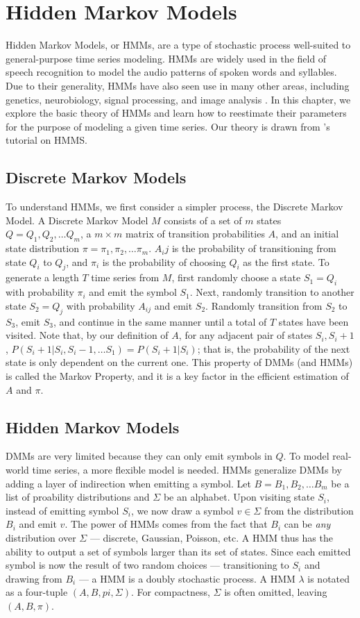 \chapter{Hidden Markov Models}
Hidden Markov Models, or HMMs, are a type of stochastic process well-suited to general-purpose time series modeling. HMMs are widely used in the field of speech recognition to model the audio patterns of spoken words and syllables. Due to their generality, HMMs have also seen use in many other areas, including genetics, neurobiology, signal processing, and image analysis \citep{pyle}. In this chapter, we explore the basic theory of HMMs and learn how to reestimate their parameters for the purpose of modeling a given time series. Our theory is drawn from \citet{rabinerpi89}'s tutorial on HMMS.
\section{Discrete Markov Models}
To understand HMMs, we first consider a simpler process, the Discrete Markov Model. A Discrete Markov Model $M$ consists of a set of $m$ states $Q = Q_1, Q_2, \dots Q_m$, a $m \times m$ matrix of transition probabilities $A$, and an initial state distribution $\pi = \pi_1, \pi_2, \dots \pi_m$. $A_ij$ is the probability of transitioning from state $Q_i$ to $Q_j$, and $\pi_i$ is the probability of choosing $Q_i$ as the first state. To generate a length $T$ time series from $M$, first randomly choose a state $S_1 = Q_i$ with probability $\pi_i$ and emit the symbol $S_1$. Next, randomly transition to another state $S_2 = Q_j$ with probability $A_{ij}$ and emit $S_2$. Randomly transition from $S_2$ to $S_3$, emit $S_3$, and continue in the same manner until a total of $T$ states have been visited. Note that, by our definition of $A$, for any adjacent pair of states $S_i, S_i+1$, $P(S_i+1|S_i, S_i-1, \dots S_1) = P(S_i+1|S_i)$; that is, the probability of the next state is only dependent on the current one. This property of DMMs (and HMMs) is called the Markov Property, and it is a key factor in the efficient estimation of $A$ and $\pi$.
\section{Hidden Markov Models}
DMMs are very limited because they can only emit symbols in $Q$. To model real-world time series, a more flexible model is needed. HMMs generalize DMMs by adding a layer of indirection when emitting a symbol. Let $B = B_1, B_2, \dots B_m$ be a list of proability distributions and $\Sigma$ be an alphabet. Upon visiting state $S_i$, instead of emitting symbol $S_i$, we now draw a symbol $v \in \Sigma$ from the distribution $B_i$ and emit $v$. The power of HMMs comes from the fact that $B_i$ can be \textit{any} distribution over $\Sigma$ --- discrete, Gaussian, Poisson, etc. A HMM thus has the ability to output a set of symbols larger than its set of states. Since each emitted symbol is now the result of two random choices --- transitioning to $S_i$ and drawing from $B_i$ --- a HMM is a doubly stochastic process. A HMM $\lambda$ is notated as a four-tuple $(A, B, pi, \Sigma)$. For compactness, $\Sigma$ is often omitted, leaving $(A, B, \pi)$.

